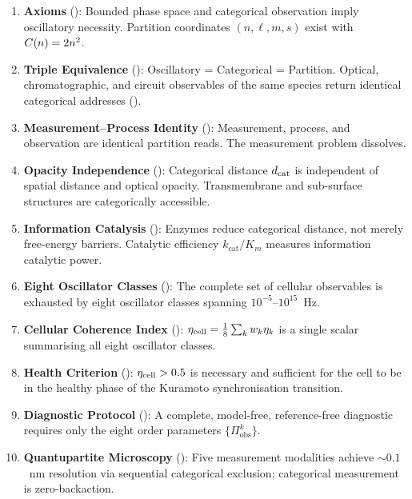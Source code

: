 \begin{enumerate}[label=\textbf{\arabic*.}, leftmargin=*, itemsep=6pt]
    \item \textbf{Axioms} (): Bounded phase space
          and categorical observation imply oscillatory necessity.  Partition
          coordinates $(n,\ell,m,s)$ exist with $C(n) = 2n^2$.

    \item \textbf{Triple Equivalence} ():
          Oscillatory = Categorical = Partition.  Optical, chromatographic, and
          circuit observables of the same species return identical categorical
          addresses ().

    \item \textbf{Measurement--Process Identity} ():
          Measurement, process, and observation are identical partition reads.
          The measurement problem dissolves.

    \item \textbf{Opacity Independence} ():
          Categorical distance $d_{\mathrm{cat}}$ is independent of spatial distance and
          optical opacity.  Transmembrane and sub-surface structures are
          categorically accessible.

    \item \textbf{Information Catalysis} ():
          Enzymes reduce categorical distance, not merely free-energy barriers.
          Catalytic efficiency $k_\mathrm{cat}/K_m$ measures information
          catalytic power.

    \item \textbf{Eight Oscillator Classes} ():
          The complete set of cellular observables is exhausted by eight
          oscillator classes spanning $10^{-5}$--$10^{15}$~Hz.

    \item \textbf{Cellular Coherence Index} ():
          $\eta_{\mathrm{cell}} = \tfrac{1}{8}\sum_k w_k \eta_k$ is a single scalar
          summarising all eight oscillator classes.

    \item \textbf{Health Criterion} ():
          $\eta_{\mathrm{cell}} > 0.5$ is necessary and sufficient for the cell to be
          in the healthy phase of the Kuramoto synchronisation transition.

    \item \textbf{Diagnostic Protocol} ():
          A complete, model-free, reference-free diagnostic requires only
          the eight order parameters $\{\Pi_\mathrm{obs}^k\}$.

    \item \textbf{Quantupartite Microscopy} ():
          Five measurement modalities achieve $\sim 0.1$~nm resolution via
          sequential categorical exclusion; categorical measurement is
          zero-backaction.
\end{enumerate}

